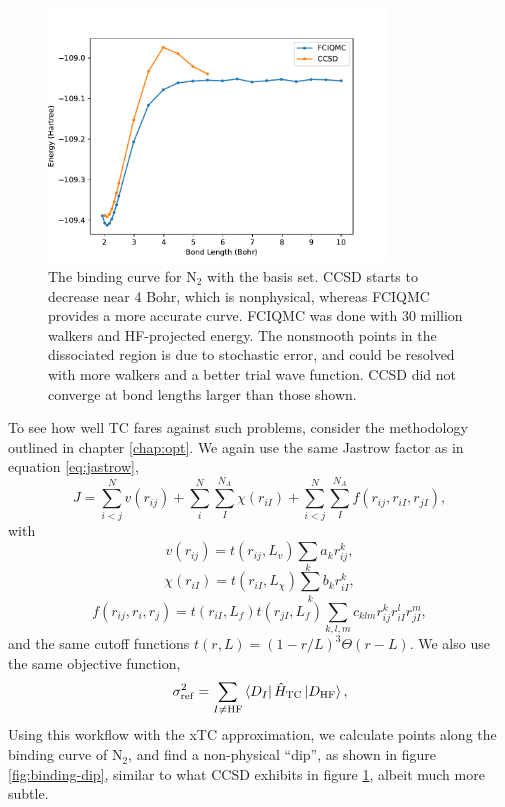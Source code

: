 \begin{figure}[htbp]
    \centering
    \includegraphics[width=0.8\textwidth]{figures/binding/N2_avtz_nontc}
    \caption{The binding curve for N$_2$ with the \avdz basis set. CCSD starts to decrease near 4 Bohr, which is nonphysical, whereas FCIQMC provides a more accurate curve. FCIQMC was done with 30 million walkers and HF-projected energy. The nonsmooth points in the dissociated region is due to stochastic error, and could be resolved with more walkers and a better trial wave function. CCSD did not converge at bond lengths larger than those shown.}
    \label{fig:ccsd-vs-fciqmc-n2}
\end{figure}

To see how well TC fares against such problems, consider the methodology outlined in chapter \ref{chap:opt}. We again use the same Jastrow factor as in equation \ref{eq:jastrow},
\begin{equation}
    \label{eq:jastrow-again}
    J = \sum_{i<j}^Nv(r_{ij}) + \sum_i^N\sum_I^{N_A}\chi(r_{iI}) + \sum_{i<j}^N\sum_I^{N_A}f(r_{ij}, r_{iI}, r_{jI}),
\end{equation}
with
\begin{equation}
    \label{eq:dtn-jastrow-ee-2}
    v(r_{ij})    = t(r_{ij},L_v)
                    \sum_{k} a_k r_{ij}^k ,
\end{equation}
\begin{equation}
    \label{eq:dtn-jastrow-en-2}
    \chi(r_{iI}) = t(r_{iI},L_\chi)
    \sum_{k} b_k r_{iI}^k ,
\end{equation}
\begin{equation}
    \label{eq:dtn-jastrow-een-2}
    f(r_{ij}, r_{i}, r_{j}) = t(r_{iI},L_f) t(r_{jI},L_f)
    \sum_{k,l,m} c_{klm}
    r_{ij}^k r_{iI}^l r_{jI}^m ,
\end{equation}
and the same cutoff functions $t(r,L) = (1-r/L)^3
\Theta(r-L)$. We also use the same objective function,
\begin{equation}
    \label{eq:varref-hf}
    \sigma_\mathrm{ref}^2 = \sum_{I\neq \mathrm{HF}}\bra{D_I}\hat H_\mathrm{TC}\ket{D_\mathrm{HF}},
\end{equation}
Using this workflow with the xTC approximation, we calculate points along the binding curve of N$_2$, and find a non-physical ``dip'', as shown in figure \ref{fig:binding-dip}, similar to what CCSD exhibits in figure \ref{fig:ccsd-vs-fciqmc-n2}, albeit much more subtle.

